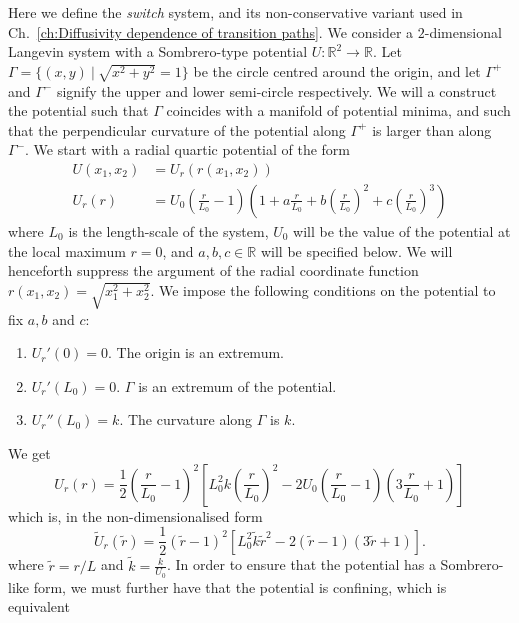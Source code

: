 \documentclass[]{cam-thesis}
\begin{document}
Here we define the \textit{switch} system, and its non-conservative variant used in Ch.~\ref{ch:Diffusivity dependence of transition paths}. We consider a $2$-dimensional Langevin system with a Sombrero-type potential $U : \mathbb{R}^2 \to \mathbb{R}$. Let $\Gamma=\{(x,y)\ |\ \sqrt{x^2 + y^2} =1\}$ be the circle centred around the origin, and let $\Gamma^{+}$ and
$\Gamma^{-}$ signify the upper and lower semi-circle respectively. We will a construct the potential such that $\Gamma$ coincides with a manifold of potential minima, and such that the perpendicular curvature of the potential along $\Gamma^{+}$ is larger than along $\Gamma^{-}$. We
start with a radial quartic potential of the form 
\begin{align}
U(x_{1},x_{2}) & =U_{r}(r(x_{1},x_{2}))\\
U_{r}(r) & =U_{0}\left(\frac{r}{L_0}-1\right)\left(1+a\frac{r}{L_0}+b\left(\frac{r}{L_0}\right)^{2}+c\left(\frac{r}{L_0}\right)^{3}\right)\nonumber 
\end{align}
where $L_0$ is the length-scale of the system, $U_{0}$ will be the
value of the potential at the local maximum $r=0$, and $a,b,c\in\mathbb{R}$
will be specified below. We will henceforth suppress the argument of
the radial coordinate function $r(x_{1},x_{2})=\sqrt{x_{1}^{2}+x_{2}^{2}}$. We
impose the following conditions on the potential to fix $a, b$ and $c$:
\begin{enumerate}
\item $U_r'(0) = 0$. The origin is an extremum.
\item $U_r'(L_0) = 0$. $\Gamma$ is an extremum of the potential.
\item $U_r''(L_0) = k$. The curvature along $\Gamma$ is $k$.
\end{enumerate}
We get
\begin{equation}
U_{r}(r)=\frac{1}{2}\left(\frac{r}{L_0}-1\right)^{2}\left[L_0^{2} k \left(\frac{r}{L_0}\right)^{2}-2U_{0}\left(\frac{r}{L_0}-1\right)\left(3\frac{r}{L_0}+1\right)\right]
\end{equation}
which is, in the non-dimensionalised form
\begin{equation}
\tilde{U}_{r}(\tilde{r})= \frac{1}{2} 
\left( \tilde{r} -1 \right)^{2} \left[L_0^{2} \tilde{k} \tilde{r}^{2}-2  
\left(\tilde{r}-1\right)\left(3\tilde{r}+1\right)\right].
\end{equation}
where $\tilde{r} = r / L$ and $\tilde{k} = \frac{k}{U_0}$. In order to ensure that the potential has a Sombrero-like form, we
must further have that the potential is confining, which is equivalent
\end{document}
